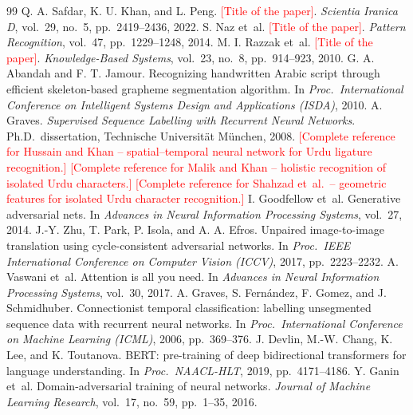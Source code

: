 \documentclass[12pt,a4paper]{report}
\newcommand{\todo}[1]{\textcolor{red}{[#1]}}
\begin{document}
\begin{thebibliography}{99}
\setlength{\itemsep}{4pt}
 Q. A. Safdar, K. U. Khan, and L. Peng. \todo{Title of the paper}. \textit{Scientia Iranica D}, vol.~29, no.~5, pp.~2419--2436, 2022.
 S. Naz et~al. \todo{Title of the paper}. \textit{Pattern Recognition}, vol.~47, pp.~1229--1248, 2014.
 M. I. Razzak et~al. \todo{Title of the paper}. \textit{Knowledge-Based Systems}, vol.~23, no.~8, pp.~914--923, 2010.
 G. A. Abandah and F. T. Jamour. Recognizing handwritten Arabic script through efficient skeleton-based grapheme segmentation algorithm. In \textit{Proc.\ International Conference on Intelligent Systems Design and Applications (ISDA)}, 2010.
 A. Graves. \textit{Supervised Sequence Labelling with Recurrent Neural Networks}. Ph.D.\ dissertation, Technische Universit\"at M\"unchen, 2008.
 \todo{Complete reference for Hussain and Khan -- spatial--temporal neural network for Urdu ligature recognition.}
 \todo{Complete reference for Malik and Khan -- holistic recognition of isolated Urdu characters.}
 \todo{Complete reference for Shahzad et~al.\ -- geometric features for isolated Urdu character recognition.}
 I. Goodfellow et~al. Generative adversarial nets. In \textit{Advances in Neural Information Processing Systems}, vol.~27, 2014.
 J.-Y. Zhu, T. Park, P. Isola, and A. A. Efros. Unpaired image-to-image translation using cycle-consistent adversarial networks. In \textit{Proc.\ IEEE International Conference on Computer Vision (ICCV)}, 2017, pp.~2223--2232.
 A. Vaswani et~al. Attention is all you need. In \textit{Advances in Neural Information Processing Systems}, vol.~30, 2017.
 A. Graves, S. Fern\'andez, F. Gomez, and J. Schmidhuber. Connectionist temporal classification: labelling unsegmented sequence data with recurrent neural networks. In \textit{Proc.\ International Conference on Machine Learning (ICML)}, 2006, pp.~369--376.
 J. Devlin, M.-W. Chang, K. Lee, and K. Toutanova. BERT: pre-training of deep bidirectional transformers for language understanding. In \textit{Proc.\ NAACL-HLT}, 2019, pp.~4171--4186.
 Y. Ganin et~al. Domain-adversarial training of neural networks. \textit{Journal of Machine Learning Research}, vol.~17, no.~59, pp.~1--35, 2016.
\end{thebibliography}

\end{document}

